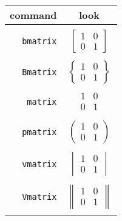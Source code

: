 \documentclass{article}
\begin{document}
\begin{tabular}{r c}
command & look\\
\hline & \\
\texttt{bmatrix} & $\begin{bmatrix} 1 & 0 \\ 0 & 1 \end{bmatrix}$ \\
\\
\texttt{Bmatrix} & $\begin{Bmatrix} 1 & 0 \\ 0 & 1 \end{Bmatrix}$ \\
\\
\texttt{matrix} & $\begin{matrix} 1 & 0 \\ 0 & 1 \end{matrix}$ \\
\\
\texttt{pmatrix} & $\begin{pmatrix} 1 & 0 \\ 0 & 1 \end{pmatrix}$ \\
\\
\texttt{vmatrix} & $\begin{vmatrix} 1 & 0 \\ 0 & 1 \end{vmatrix}$ \\
\\
\texttt{Vmatrix} & $\begin{Vmatrix} 1 & 0 \\ 0 & 1 \end{Vmatrix}$ \\
\\
\end{tabular}
\end{document}
